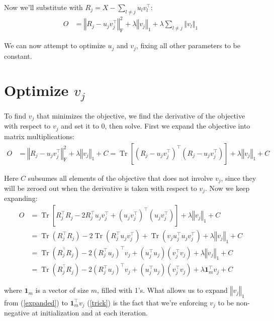 \documentclass{article}
\DeclareMathOperator{\Tr}{Tr}
\begin{document}
Now we'll substitute with $R_j = X - \sum_{l\neq j} u_{l} v^{\top}_{l}$:
\begin{align}
O &= 
\left\Vert R_j -u_{j} v^{\top}_{j}  \right\Vert_\text{F}^2 
+\lambda\left\Vert v_j \right\Vert_1
+\lambda \sum_{l \neq j} \left\Vert v_l \right\Vert_1
\end{align}

We can now attempt to optimize $u_{j}$ and $v_{j}$, fixing all other parameters to be constant. 

\medskip
\section*{Optimize $v_{j}$}
To find $v_{j}$ that minimizes the objective, we find the derivative of the objective with respect to $v_{j}$ and set it to 0, then solve. First we expand the objective into matrix multiplications:
\begin{align}
O &= 
\left\Vert R_j -u_{j} v^{\top}_{j}  \right\Vert_\text{F}^2 
+\lambda\left\Vert v_j \right\Vert_1
+ C =
\Tr \left[
\left( R_j -u_{j} v^{\top}_{j} \right)^\top \left( R_j -u_{j} v^{\top}_{j} \right) \right]
+\lambda \left\Vert v_j \right\Vert_1
+ C
\end{align}

Here $C$ subsumes all elements of the objective that does not involve $v_j$, since they will be zeroed out when the derivative is taken with respect to $v_j$. Now we keep expanding:
\begin{align}
O &= 
\Tr \left[
R_j^\top R_j 
- 2R_j ^\top  u_j v_j^\top
+ \left( u_j v_j^\top \right)^\top \left( u_j v_j^\top \right) 
\right] 
+\lambda \left\Vert v_j \right\Vert_1
+ C \\
&= \Tr \left( R^\top_j R_j \right)
- 2 \Tr \left( R^\top_j u_{j} v^\top_{j} \right)
+  \Tr \left( v_{j}  u^{\top}_{j}   u_{j} v^{\top}_{j} \right)
+\lambda \left\Vert v_j \right\Vert_1
+ C \\
&= \Tr \left( R^{^\top}_j R_j \right)
- 2 \left( R^{\top}_j u_{j}  \right)^\top v_{j} 
+  \left( u^{\top}_{j}   u_{j} \right)\left( v^{\top}_{j} v_{j}  \right) 
+\lambda \left\Vert v_j \right\Vert_1
+ C \label{expanded} \\
&= \Tr \left( R^{^\top}_j R_j \right)
- 2 \left( R^{\top}_j u_{j}  \right)^\top v_{j} 
+  \left( u^{\top}_{j}   u_{j} \right)\left( v^{\top}_{j} v_{j}  \right) 
+\lambda \boldsymbol{1}_m^\top v_j
+ C \label{trick}
\end{align}

where $\boldsymbol{1}_m$ is a vector of size $m$, filled with 1's. What allows us to expand $ \left\Vert v_j \right\Vert_1$ from (\ref{expanded}) to $\boldsymbol{1}_m^\top v_j$ (\ref{trick}) is the fact that we're enforcing $v_j$ to be non-negative at initialization and at each iteration.
\end{document}
